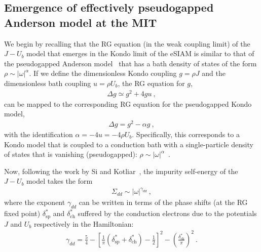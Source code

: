 \documentclass[reprint,hidelinks]{revtex4-2}
\begin{document}
\begin{widetext}
\section{Emergence of effectively pseudogapped Anderson model at the MIT}
We begin by recalling that the RG equation (in the weak coupling limit) of the \(J-U_b\) model that emerges in the Kondo limit of the eSIAM is similar to that of the pseudogapped Anderson model~\cite{fritzvojta2004} that has a bath density of states of the form \(\rho\sim |\omega|^\alpha\). If we define the dimensionless Kondo coupling \(g = \rho J\) and the dimensionless bath coupling \(u = \rho U_b\), the RG equation for \(g\),
\begin{equation}\begin{aligned}
	\Delta g \simeq g^2 + 4gu~,
\end{aligned}\end{equation}
can be mapped to the corresponding RG equation for the pseudogapped Kondo model,
\begin{equation}\begin{aligned}
	\Delta g = g^2 - \alpha g~,
\end{aligned}\end{equation}
with the identification \(\alpha = -4u = -4\rho U_b\). Specifically, this corresponds to a Kondo model that is coupled to a conduction bath with a single-particle density of states that is vanishing (pseudogapped): $\rho\sim |\omega|^{\alpha}$~.
\par
Now, following the work by Si and Kotliar~\cite{kotliarsi_1993}, the impurity self-energy of the \(J-U_b\) model takes the form
	\begin{equation}\begin{aligned}
		\Sigma_{dd} \sim |\omega|^{\gamma_{dd}}~,
	\end{aligned}\end{equation}
	where the exponent \(\gamma_{dd}\) can be written in terms of the phase shifts (at the RG fixed point) \(\delta^*_\text{sp}\) and \(\delta^*_\text{ch}\) suffered by the conduction electrons due to the potentials \(J\) and \(U_b\) respectively in the Hamiltonian:
	\begin{equation}\begin{aligned}
		\gamma_{dd} = \frac{5}{4} - \left[ \frac{1}{\pi}\left( \delta^*_\text{sp} + \delta^*_\text{ch} \right) - \frac{1}{2}  \right]^2 - \left( \frac{\delta^*_\text{ch}}{\pi} \right)^2~.
	\end{aligned}\end{equation}

\end{widetext}
\end{document}
